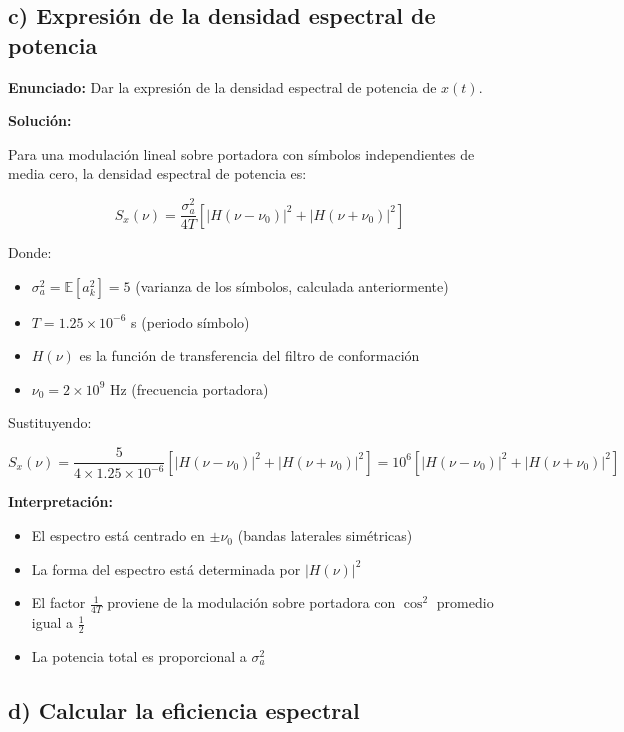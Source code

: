 \documentclass[11pt,a4paper]{article}
\begin{document}
\subsection*{c) Expresi\'on de la densidad espectral de potencia}

\textbf{Enunciado:} Dar la expresi\'on de la densidad espectral de potencia de $x(t)$.

\vspace{0.3cm}
\textbf{Soluci\'on:}

Para una modulaci\'on lineal sobre portadora con s\'imbolos independientes de media cero, la densidad espectral de potencia es:

\[
\boxed{S_x(\nu) = \frac{\sigma_a^2}{4T}\left[|H(\nu - \nu_0)|^2 + |H(\nu + \nu_0)|^2\right]}
\]

Donde:
\begin{itemize}
    \item $\sigma_a^2 = \mathbb{E}[a_k^2] = 5$ (varianza de los s\'imbolos, calculada anteriormente)
    \item $T = 1.25 \times 10^{-6}$ s (periodo s\'imbolo)
    \item $H(\nu)$ es la funci\'on de transferencia del filtro de conformaci\'on
    \item $\nu_0 = 2 \times 10^9$ Hz (frecuencia portadora)
\end{itemize}

Sustituyendo:

\[
\boxed{S_x(\nu) = \frac{5}{4 \times 1.25 \times 10^{-6}}\left[|H(\nu - \nu_0)|^2 + |H(\nu + \nu_0)|^2\right] = 10^6\left[|H(\nu - \nu_0)|^2 + |H(\nu + \nu_0)|^2\right]}
\]

\textbf{Interpretaci\'on:}
\begin{itemize}
    \item El espectro est\'a centrado en $\pm\nu_0$ (bandas laterales sim\'etricas)
    \item La forma del espectro est\'a determinada por $|H(\nu)|^2$
    \item El factor $\frac{1}{4T}$ proviene de la modulaci\'on sobre portadora con $\cos^2$ promedio igual a $\frac{1}{2}$
    \item La potencia total es proporcional a $\sigma_a^2$
\end{itemize}



\subsection*{d) Calcular la eficiencia espectral}
\end{document}
